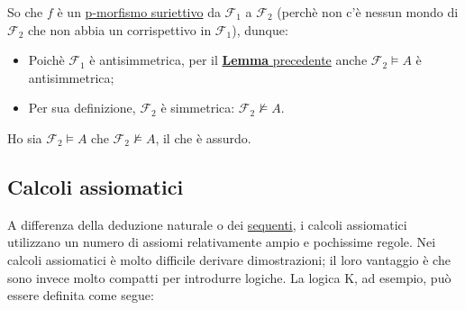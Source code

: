 \documentclass[a4paper,12pt]{article}
\begin{document}
\begin{dimo}
\begin{enumerate}
	\end{enumerate}
	So che $f$ è un \hyperlink{lempmorfsurstrut}{p-morfismo suriettivo} da $\mathcal{F}_1$ a $\mathcal{F}_2$ (perchè non c'è nessun mondo di $\mathcal{F}_2$ che non abbia un corrispettivo in $\mathcal{F}_1$), dunque:
	\begin{itemize}
		\item Poichè $\mathcal{F}_1$ è antisimmetrica, per il \hyperlink{lempmorfsurstrut}{\textbf{Lemma} precedente} anche $\mathcal{F}_2 \vDash A$ è antisimmetrica;
		\item Per sua definizione, $\mathcal{F}_2$ è simmetrica: $\mathcal{F}_2 \nvDash A$.
	\end{itemize}
	Ho sia $\mathcal{F}_2 \vDash A$ che $\mathcal{F}_2 \nvDash A$, il che è assurdo. \\
\end{dimo}

\newpage
\subsection{Calcoli assiomatici}
\noindent A differenza della deduzione naturale o dei \hyperlink{seq}{sequenti}, i calcoli assiomatici utilizzano un numero di assiomi relativamente ampio e pochissime regole. Nei calcoli assiomatici è molto difficile derivare dimostrazioni; il loro vantaggio è che sono invece molto compatti per introdurre logiche. La logica K, ad esempio, può essere definita come segue: \\
\end{document}
